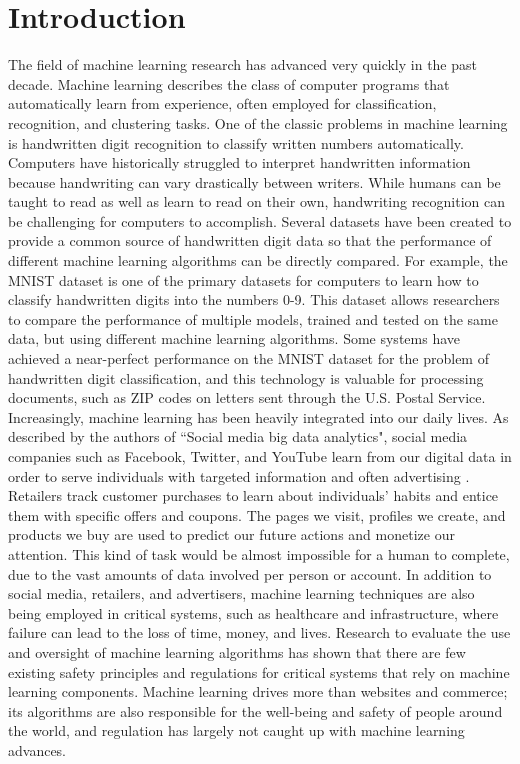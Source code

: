 \chapter{Introduction}

The field of machine learning research has advanced very quickly in the past decade. Machine learning describes the class of computer programs that automatically learn from experience, often employed for classification, recognition, and clustering tasks. One of the classic problems in machine learning is handwritten digit recognition to classify written numbers automatically. Computers have historically struggled to interpret handwritten information because handwriting can vary drastically between writers. While humans can be taught to read as well as learn to read on their own, handwriting recognition can be challenging for computers to accomplish. Several datasets have been created to provide a common source of handwritten digit data so that the performance of different machine learning algorithms can be directly compared. For example, the MNIST dataset \cite{LBBH98} is one of the primary datasets for computers to learn how to classify handwritten digits into the numbers 0-9. This dataset allows researchers to compare the performance of multiple models, trained and tested on the same data, but using different machine learning algorithms. Some systems have achieved a near-perfect performance on the MNIST dataset for the problem of handwritten digit classification, and this technology is valuable for processing documents, such as ZIP codes on letters sent through the U.S. Postal Service.
\\Increasingly, machine learning has been heavily integrated into our daily lives. As described by the authors of ``Social media big data analytics", social media companies such as Facebook, Twitter, and YouTube learn from our digital data in order to serve individuals with targeted information and often advertising \cite{GHHA19}. Retailers track customer purchases to learn about individuals' habits and entice them with specific offers and coupons. The pages we visit, profiles we create, and products we buy are used to predict our future actions and monetize our attention. This kind of task would be almost impossible for a human to complete, due to the vast amounts of data involved per person or account. In addition to social media, retailers, and advertisers, machine learning techniques are also being employed in critical systems, such as healthcare and infrastructure, where failure can lead to the loss of time, money, and lives. Research to evaluate the use and oversight of machine learning algorithms \cite{Var16} has shown that there are few existing safety principles and regulations for critical systems that rely on machine learning components. Machine learning drives more than websites and commerce; its algorithms are also responsible for the well-being and safety of people around the world, and regulation has largely not caught up with machine learning advances.

